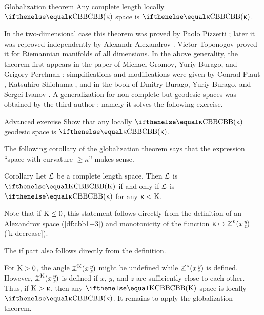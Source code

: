 \begin{thm}{Globalization theorem}\label{thm:glob} 
Any complete length locally $\Alex\kappa$ space is $\Alex\kappa$.
\end{thm}

{\sloppy

In the two-dimensional case this theorem was proved by Paolo Pizzetti \cite{pizzetti};
later it was reproved independently by Alexandr Alexandrov \cite{alexandrov:devel}. %
Victor Toponogov \cite{toponogov-globalization+splitting} proved it for Riemannian manifolds of all dimensions.
In the above generality, the theorem first appears in the paper of Michael Gromov, Yuriy Burago, and Grigory Perelman \cite{burago-gromov-perelman}; 
simplifications and modifications were given by Conrad Plaut \cite{plaut:dimension}, Katsuhiro Shiohama \cite{shiohama}, and in the book of Dmitry Burago, Yuriy Burago, and Sergei Ivanov \cite{burago-burago-ivanov}.
A generalization for non-complete but geodesic spaces was obtained by the third author \cite{petrunin:globalization}; namely it solves the following exercise.

}

\begin{thm}{Advanced exercise}\label{ex:noncomplete-globalization}
Show that any locally $\Alex\kappa$ geodesic space is $\Alex\kappa$.
\end{thm}


The following corollary of the globalization  theorem says that the expression ``space with curvature $\ge \kappa$'' makes sense.

\begin{thm}{Corollary}\label{cor:CAT>k-sence}
Let $\mathcal{L}$ be a complete length space.
Then $\mathcal{L}$ is $\Alex\Kappa$ if and only if $\mathcal{L}$ is $\Alex\kappa$ for any $\upkappa<\mathrm{K}$.
\end{thm}

Note that if $\Kappa\le 0$, this statement follows directly from the  definition of an Alexandrov space (\ref{df:cbb1+3}) and monotonicity of the function $\kappa\mapsto\angk\kappa x y z$ (\ref{k-decrease}).

The if part also follows directly from the definition.

For $\mathrm{K}>0$, the angle $\angk{\Kappa} x y z$ might be undefined while $\angk{\kappa} x y z$ is defined.
However, $\angk{\Kappa} x y z$ is defined if $x$, $y$, and $z$ are sufficiently close to each other.
Thus, if $\mathrm{K}>\upkappa$, then any $\Alex\Kappa$ space is locally $\Alex\kappa$.
It remains to apply the  globalization theorem.
\qeds

